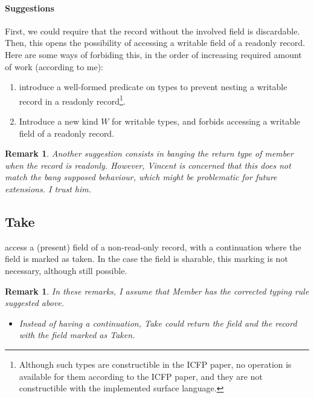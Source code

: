 \documentclass{article}
\newtheorem{remark}[theorem]{Remark}
\begin{document}
\paragraph{Suggestions}
First, we could require that the record without the involved field is discardable.
Then, this opens the possibility of accessing a writable field of a readonly
record.
Here are some ways of forbiding this, in the order of increasing required amount of work (according to me):
\begin{enumerate}
\item introduce a well-formed predicate on types to prevent nesting a writable record in a readonly
  record\footnote{Although such types are constructible in the ICFP paper, no
    operation is available for them according to the ICFP paper, and
    they are not constructible with the implemented surface language.}.
  \item Introduce a new kind $W$ for writable types, and forbids accessing a writable
    field of a readonly record.
\end{enumerate}
\begin{remark}
 Another suggestion consists in banging the return type of member when the record is readonly.
 However, Vincent is concerned that this does not match the bang supposed
 behaviour, which might be problematic for future extensions.
 I trust him.
\end{remark}
\subsection{Take}
    access a (present) field of a non-read-only record, with a continuation where
    the field is marked as taken. In the case the field is sharable,
    this marking is not necessary, although still possible.
    \begin{remark}
      In these remarks, I assume that Member has the corrected typing rule
      suggested above.
      \begin{itemize}
      \item Instead of having a continuation, Take could return the field and the record 
        with the field marked as Taken.
        \end{itemize}
        \end{remark}
\end{document}
